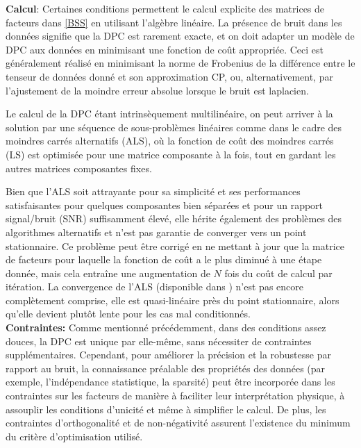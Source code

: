 \documentclass[11pt,a4paper,oneside]{book}
\begin{document}
\textbf{Calcul}: Certaines conditions permettent le calcul explicite des matrices de facteurs dans \eqref{BSS} en utilisant l'algèbre linéaire. La présence de bruit dans les données signifie que la DPC est rarement exacte, et on doit adapter un modèle de DPC aux données en minimisant une fonction de coût appropriée. Ceci est généralement réalisé en minimisant la norme de Frobenius de la différence entre le tenseur de données donné et son approximation CP, ou, alternativement, par l'ajustement de la moindre erreur absolue lorsque le bruit est laplacien. 

Le calcul de la DPC étant intrinsèquement multilinéaire, on peut arriver à la solution par une séquence de sous-problèmes linéaires comme dans le cadre des moindres carrés alternatifs (ALS), où la fonction de coût des moindres carrés (LS) est optimisée pour une matrice composante à la fois, tout en gardant les autres matrices composantes fixes.

Bien que l'ALS soit attrayante pour sa simplicité et ses performances satisfaisantes pour quelques composantes bien séparées et pour un rapport signal/bruit (SNR) suffisamment élevé, elle hérite également des problèmes des algorithmes alternatifs et n'est pas garantie de converger vers un point stationnaire. Ce problème peut être corrigé en ne mettant à jour que la matrice de facteurs pour laquelle la fonction de coût a le plus diminué à une étape donnée, mais cela entraîne une augmentation de $ N $ fois du coût de calcul par itération. La convergence de l'ALS (disponible dans \cite[p.471]{Hong2008} ) n'est pas encore complètement comprise, elle est quasi-linéaire près du point stationnaire, alors qu'elle devient plutôt lente pour les cas mal conditionnés.\\

\textbf{Contraintes: }Comme mentionné précédemment, dans des conditions assez douces, la DPC est unique par elle-même, sans nécessiter de contraintes supplémentaires. Cependant, pour améliorer la précision et la robustesse par rapport au bruit, la connaissance préalable des propriétés des données (par exemple, l'indépendance statistique, la sparsité) peut être incorporée dans les contraintes sur les facteurs de manière à faciliter leur interprétation physique, à assouplir les conditions d'unicité et même à simplifier le calcul. De plus, les contraintes d'orthogonalité et de non-négativité assurent l'existence du minimum du critère d'optimisation utilisé.\\
\end{document}
